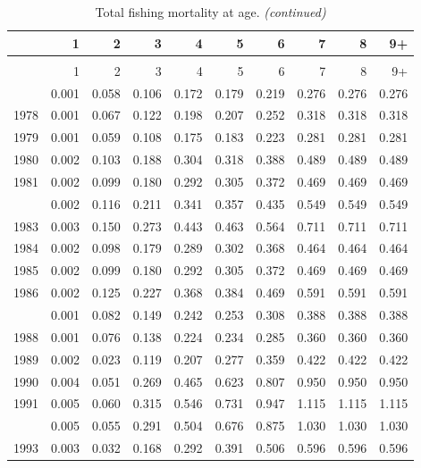 \documentclass[
]{article}
\begin{document}
\begin{longtable}[t]{lrrrrrrrrr}
\caption{\label{tab:FAA-tot-table}Total fishing mortality at age.}\\
\toprule
  & 1 & 2 & 3 & 4 & 5 & 6 & 7 & 8 & 9+\\
\midrule
\endfirsthead
\caption[]{Total fishing mortality at age. \textit{(continued)}}\\
\toprule
  & 1 & 2 & 3 & 4 & 5 & 6 & 7 & 8 & 9+\\
\midrule
\endhead

\endfoot
\bottomrule
\endlastfoot
1977 & 0.001 & 0.058 & 0.106 & 0.172 & 0.179 & 0.219 & 0.276 & 0.276 & 0.276\\
1978 & 0.001 & 0.067 & 0.122 & 0.198 & 0.207 & 0.252 & 0.318 & 0.318 & 0.318\\
1979 & 0.001 & 0.059 & 0.108 & 0.175 & 0.183 & 0.223 & 0.281 & 0.281 & 0.281\\
1980 & 0.002 & 0.103 & 0.188 & 0.304 & 0.318 & 0.388 & 0.489 & 0.489 & 0.489\\
1981 & 0.002 & 0.099 & 0.180 & 0.292 & 0.305 & 0.372 & 0.469 & 0.469 & 0.469\\
\addlinespace
1982 & 0.002 & 0.116 & 0.211 & 0.341 & 0.357 & 0.435 & 0.549 & 0.549 & 0.549\\
1983 & 0.003 & 0.150 & 0.273 & 0.443 & 0.463 & 0.564 & 0.711 & 0.711 & 0.711\\
1984 & 0.002 & 0.098 & 0.179 & 0.289 & 0.302 & 0.368 & 0.464 & 0.464 & 0.464\\
1985 & 0.002 & 0.099 & 0.180 & 0.292 & 0.305 & 0.372 & 0.469 & 0.469 & 0.469\\
1986 & 0.002 & 0.125 & 0.227 & 0.368 & 0.384 & 0.469 & 0.591 & 0.591 & 0.591\\
\addlinespace
1987 & 0.001 & 0.082 & 0.149 & 0.242 & 0.253 & 0.308 & 0.388 & 0.388 & 0.388\\
1988 & 0.001 & 0.076 & 0.138 & 0.224 & 0.234 & 0.285 & 0.360 & 0.360 & 0.360\\
1989 & 0.002 & 0.023 & 0.119 & 0.207 & 0.277 & 0.359 & 0.422 & 0.422 & 0.422\\
1990 & 0.004 & 0.051 & 0.269 & 0.465 & 0.623 & 0.807 & 0.950 & 0.950 & 0.950\\
1991 & 0.005 & 0.060 & 0.315 & 0.546 & 0.731 & 0.947 & 1.115 & 1.115 & 1.115\\
\addlinespace
1992 & 0.005 & 0.055 & 0.291 & 0.504 & 0.676 & 0.875 & 1.030 & 1.030 & 1.030\\
1993 & 0.003 & 0.032 & 0.168 & 0.292 & 0.391 & 0.506 & 0.596 & 0.596 & 0.596\\

\end{longtable}
\end{document}
